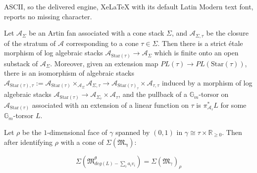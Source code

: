 \documentclass[10pt,a4paper]{amsart}
\begin{document}
ASCII, so the delivered engine, XeLaTeX with its default Latin Modern text font, reports no missing character.
\begin{lemma}\label{stratadecomp}
Let $\mathcal{A}_{\Sigma}$ be an Artin fan associated with a cone stack $\Sigma$, and $\mathcal{A}_{\Sigma,\tau}$ be the closure of the stratum of $\mathcal{A}$ corresponding to a cone $\tau \in \Sigma$. Then there is a strict \'etale morphism of log algebraic stacks $\mathcal{A}_{\text{Star}(\tau)} \rightarrow \mathcal{A}_{\Sigma}$ which is finite onto an open substack of $ \mathcal{A}_{\Sigma}$. Moreover, given an extension map $PL(\tau) \rightarrow PL(\text{Star}(\tau))$, there is an isomorphism of algebraic stacks $\mathcal{A}_{\text{Star}(\tau),\tau}:= \mathcal{A}_{\text{Star}(\tau)}\times_{\mathcal{A}_{\Sigma}} \mathcal{A}_{\Sigma,\tau}\rightarrow \mathcal{A}_{\text{Star}(\tau)_{\tau}}\times \mathcal{A}_{\tau,\tau} $ induced by a morphism of log algebraic stacks $\mathcal{A}_{\text{Star}(\tau)}\rightarrow \mathcal{A}_{\Sigma_{\tau}}\times \mathcal{A}_{\tau} $, and the pullback of a $\mathbb{G}_m$-torsor on $\mathcal{A}_{\text{Star}(\tau)}$ associated with an extension of a linear function on $\tau$ is $\pi_{\mathcal{A}_{\tau}}^*L$ for some $\mathbb{G}_m$-torsor $L$.



\end{lemma}

\begin{lemma}\label{strict}
Let $\rho$ be the $1$-dimensional face of $\gamma$ spanned by $(0,1)$ in $\gamma \cong \tau \times \mathbb{R}_{\ge 0}$. Then after identifying $\rho$ with a cone of $\Sigma(\mathfrak{M}_{\pmb\gamma})$:

\[\Sigma(\mathfrak{M}^\theta_{deg(L) - \sum_i a_iv_i}) = \Sigma(\mathfrak{M}_{\gamma})_{\rho}\]


\end{lemma}
\end{document}
